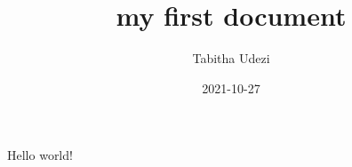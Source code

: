 \documentclass{article}
\title{my first document}
\date{2021-10-27}
\author{Tabitha Udezi}
\begin{document}
	\maketitle
	\newpage
	Hello world!
\end{document}
